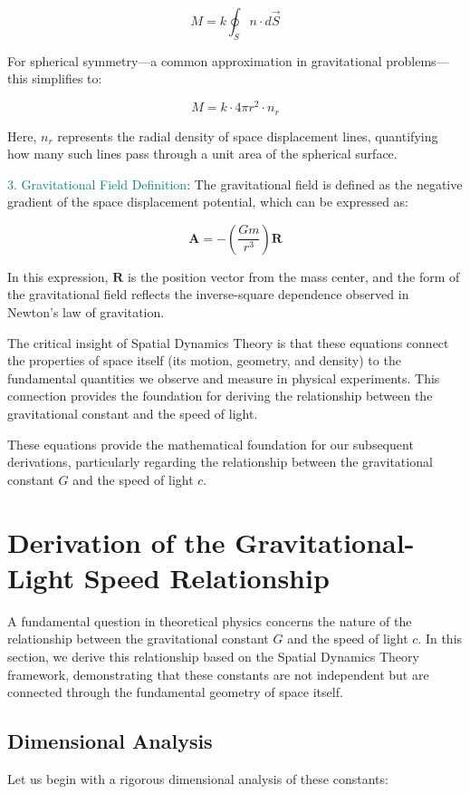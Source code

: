 \documentclass[nature,numbers]{article}
\newcommand{\tensor}[1]{\bm{#1}} %
\newcommand{\vect}[1]{\vec{#1}} %
\newcommand{\derivation}[1]{\textcolor{teal}{#1}} %
\begin{document}
$$M = k \oint_S n \cdot d\vect{S}$$

For spherical symmetry—a common approximation in gravitational problems—this simplifies to:

$$M = k \cdot 4\pi r^2 \cdot n_r$$

Here, $n_r$ represents the radial density of space displacement lines, quantifying how many such lines pass through a unit area of the spherical surface.

\derivation{3. Gravitational Field Definition}: The gravitational field is defined as the negative gradient of the space displacement potential, which can be expressed as:

$$\tensor{A} = -\left( \frac{G m}{r^3} \right) \tensor{R}$$

In this expression, $\tensor{R}$ is the position vector from the mass center, and the form of the gravitational field reflects the inverse-square dependence observed in Newton's law of gravitation.

The critical insight of Spatial Dynamics Theory is that these equations connect the properties of space itself (its motion, geometry, and density) to the fundamental quantities we observe and measure in physical experiments. This connection provides the foundation for deriving the relationship between the gravitational constant and the speed of light.

These equations provide the mathematical foundation for our subsequent derivations, particularly regarding the relationship between the gravitational constant $G$ and the speed of light $c$.

\section{Derivation of the Gravitational-Light Speed Relationship}

A fundamental question in theoretical physics concerns the nature of the relationship between the gravitational constant $G$ and the speed of light $c$. In this section, we derive this relationship based on the Spatial Dynamics Theory framework, demonstrating that these constants are not independent but are connected through the fundamental geometry of space itself.

\subsection{Dimensional Analysis}

Let us begin with a rigorous dimensional analysis of these constants:
\end{document}
